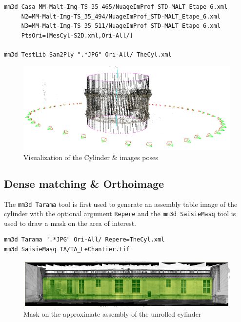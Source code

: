 \begin{verbatim}
mm3d Casa MM-Malt-Img-TS_35_465/NuageImProf_STD-MALT_Etape_6.xml 
     N2=MM-Malt-Img-TS_35_494/NuageImProf_STD-MALT_Etape_6.xml 
     N3=MM-Malt-Img-TS_35_511/NuageImProf_STD-MALT_Etape_6.xml 
     PtsOri=[MesCyl-S2D.xml,Ori-All/]
     
mm3d TestLib San2Ply ".*JPG" Ori-All/ TheCyl.xml
\end{verbatim}

\begin{figure}[H]
    \begin{center}
    \setlength{\unitlength}{0.5cm}
    \includegraphics[width=0.6\linewidth]{FIGS/ChambordTower/cyl_chambord_tower.png}
    \end{center}
    \caption{Visualization of the Cylinder \& images poses}
    \label{fig:cyl}
\end{figure}

\subsection{Dense matching \& Orthoimage}
The {\tt mm3d Tarama} tool is first used to generate an assembly table image of the cylinder with the optional argument {\tt Repere} and the {\tt mm3d SaisieMasq} tool is used to draw a mask on the area of interest.

\begin{verbatim}
mm3d Tarama ".*JPG" Ori-All/ Repere=TheCyl.xml
mm3d SaisieMasq TA/TA_LeChantier.tif
\end{verbatim}

\begin{figure}[H]
    \begin{center}
    \setlength{\unitlength}{0.5cm}
    \includegraphics[width=0.8\linewidth]{FIGS/ChambordTower/TA_chambord_tower.png}
    \end{center}
    \caption{Mask on the approximate assembly of the unrolled cylinder}
    \label{fig:TA}
\end{figure}


